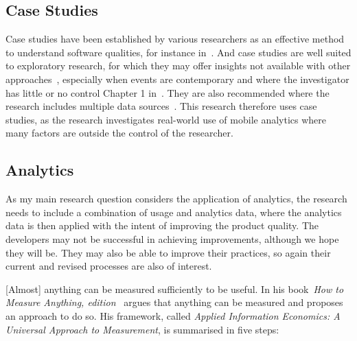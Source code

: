 \subsection{Case Studies}
Case studies have been established by various researchers as an effective method to understand software qualities, for instance in~\citep{khalid2014_prioritizing_the_devices_to_test_your_app_on_casestudy_android_games, khalid2015_what_do_mobile_app_users_complain_about, khalid2016_examining_the_relationship_between_findbugs_warnings_and_app_ratings, martinez_fernandez2019_continuously_assessing_and_improving_software_quality_with_software_analytics_tools}. And case studies are well suited to exploratory research, for which they may offer insights not available with other approaches~\citep{rowley2002_using_case_studies_in_research}, especially when events are contemporary and where the investigator has little or no control Chapter 1 in~\citep{yin2018_case_study_research_and_applications_6th_edition}. They are also recommended where the research includes multiple data sources~\citep{rowley2002_using_case_studies_in_research}. This research therefore uses case studies, as the research investigates real-world use of mobile analytics where many factors are outside the control of the researcher.



\subsection{Analytics}

As my main research question considers the application of analytics, the research needs to include a combination of usage and analytics data, where the analytics data is then applied with the intent of improving the product quality. The developers may not be successful in achieving improvements, although we hope they will be. They may also be able to improve their practices, so again their current and revised processes are also of interest.

[Almost] anything can be measured sufficiently to be useful. In his book~\emph{How to Measure Anything,  edition}~\citet{hubbard2014measure} argues that anything can be measured and proposes an approach to do so. His framework, called \emph{Applied Information Economics: A Universal Approach to Measurement}, is summarised in five steps:

